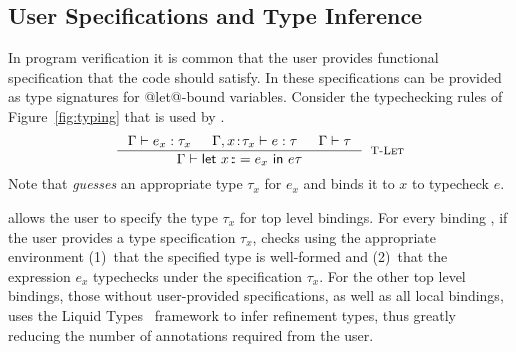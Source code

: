 \begin{comment}
\mypara{Finite vs. Infinite Lists}
%
Thus, the combination of refinements 
and labels allows our stratified type 
system to specify and verify whether 
a list is finite or infinite.
%
Note that:
%
$\FinTy{\mathtt{L}}\ a$ represents
\emph{finite} lists \ie those 
produced using the (inductive) 
terminating fixpoint combinators,
%
$\WnfTy{\mathtt{L}}\ a$ represents 
(potentially) infinite lists which 
are guaranteed to reduce to values, 
\ie non-diverging computations that
yield finite or infinite lists,
and
$\DivTy{\mathtt{L}}\ a$ represents 
computations that may diverge or 
produce a finite or infinite list.

\end{comment}

\subsection{User Specifications and Type Inference}

In program verification it is common that the user provides functional
specification that the code should satisfy.
In \toolname these specifications can be provided as type signatures 
for @let@-bound variables.
%
Consider the typechecking rules of Figure~\ref{fig:typing}
that is used by \declang.
%
$$
\inference{
	\hastype{\Gamma}{e_x}{\tau_{x}} &&
	\hastype{\Gamma,\tbind{x}{\tau_x}}{e}{\tau} &&
	\iswellformed{\Gamma}{\tau}
}{
	\hastype{\Gamma}{\elet{x}{e_x}{e}}{\tau}
}[\rtlet]
$$
%
Note that \rtlet \emph{guesses} an appropriate type $\tau_x$
for $e_x$ and binds it to $x$ to typecheck $e$.

\toolname allows the user to specify the type $\tau_x$ for top level bindings.
%
For every binding , if the user provides a type specification $\tau_x$,
\toolname checks using the appropriate environment 
(1)~that the specified type is well-formed and 
(2)~that the expression $e_x$ typechecks under the specification $\tau_x$.
%
For the other top level bindings, \ie those without user-provided specifications, 
as well as all local bindings, \toolname uses the Liquid Types~\citep{LiquidPLDI08} 
framework to infer refinement types, thus greatly reducing the number of annotations 
required from the user.


